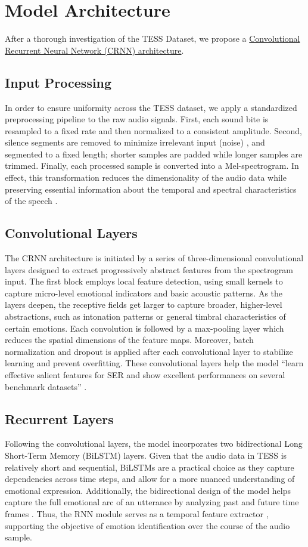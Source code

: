 \documentclass[../main.tex]{subfiles}
\begin{document}
\section{Model Architecture}
After a thorough investigation of the TESS Dataset, we propose a \hyperref[fig:architecture]{Convolutional
Recurrent Neural Network (CRNN) architecture}.

\subsection{Input Processing}
In order to ensure uniformity across the TESS dataset, we apply a standardized
preprocessing pipeline to the raw audio signals. First, each sound bite is
resampled to a fixed rate and then normalized to a consistent amplitude. Second,
silence segments are removed to minimize irrelevant input (noise) \citep{Orhan2021}, and segmented
to a fixed length; shorter samples are padded while longer samples are trimmed.
Finally, each processed sample is converted into a Mel-spectrogram. In effect,
this transformation reduces the dimensionality of the audio data while
preserving essential information about the temporal and spectral characteristics
of the speech \citep{Orhan2021}.

\subsection{Convolutional Layers}
The CRNN architecture is initiated by a series of three-dimensional convolutional
layers designed to extract progressively abstract features from the spectrogram
input. The first block employs local feature detection, using small kernels to
capture micro-level emotional indicators and basic acoustic patterns. As the
layers deepen, the receptive fields get larger to capture broader, higher-level
abstractions, such as intonation patterns or general timbral characteristics of
certain emotions. Each convolution is followed by a max-pooling layer which
reduces the spatial dimensions of the feature maps. Moreover, batch
normalization and dropout is applied after each convolutional layer to stabilize
learning and prevent overfitting. These convolutional layers help the model ``learn effective salient features for SER and show excellent performances on several benchmark datasets'' \citep{Chen2018}.

\subsection{Recurrent Layers}
Following the convolutional layers, the model incorporates two bidirectional
Long Short-Term Memory (BiLSTM) layers. Given that the audio data in TESS is
relatively short and sequential, BiLSTMs are a practical choice as they capture
dependencies across time steps, and allow for a more nuanced understanding of
emotional expression. Additionally, the bidirectional design of the model helps
capture the full emotional arc of an utterance by analyzing past and future time
frames \citep{Orhan2021}. Thus, the RNN module serves as a temporal feature extractor \citep{Chen2018}, supporting
the objective of emotion identification over the course of the audio sample.
\end{document}
